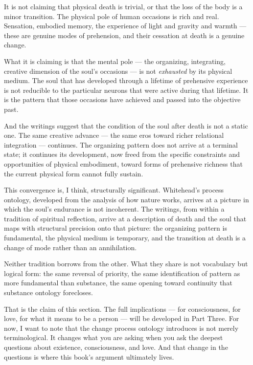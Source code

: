 It is not claiming that physical death is trivial, or that the loss of the
body is a minor transition.
The physical pole of human occasions is rich and real.
Sensation, embodied memory, the experience of light and gravity and warmth
--- these are genuine modes of prehension, and their cessation at death is
a genuine change.

What it is claiming is that the mental pole --- the organizing, integrating,
creative dimension of the soul's occasions --- is not \emph{exhausted} by
its physical medium.
The soul that has developed through a lifetime of prehensive experience is
not reducible to the particular neurons that were active during that lifetime.
It is the pattern that those occasions have achieved and passed into the
objective past.

And the \bahai{} writings suggest that the condition of the soul after death
is not a static one.
The same creative advance --- the same eros toward richer relational
integration --- continues.
The organizing pattern does not arrive at a terminal state; it continues
its development, now freed from the specific constraints and opportunities
of physical embodiment, toward forms of prehensive richness that the current
physical form cannot fully sustain.

This convergence is, I think, structurally significant.
Whitehead's process ontology, developed from the analysis of how nature
works, arrives at a picture in which the soul's endurance is not incoherent.
The \bahai{} writings, from within a tradition of spiritual reflection,
arrive at a description of death and the soul that maps with structural
precision onto that picture: the organizing pattern is fundamental, the
physical medium is temporary, and the transition at death is a change of
mode rather than an annihilation.

Neither tradition borrows from the other.
What they share is not vocabulary but logical form: the same reversal of
priority, the same identification of pattern as more fundamental than
substance, the same opening toward continuity that substance ontology
forecloses.

That is the claim of this section.
The full implications --- for consciousness, for love, for what it means
to be a person --- will be developed in Part Three.
For now, I want to note that the change process ontology introduces is
not merely terminological.
It changes what you are asking when you ask the deepest questions about
existence, consciousness, and love.
And that change in the questions is where this book's argument ultimately lives.

